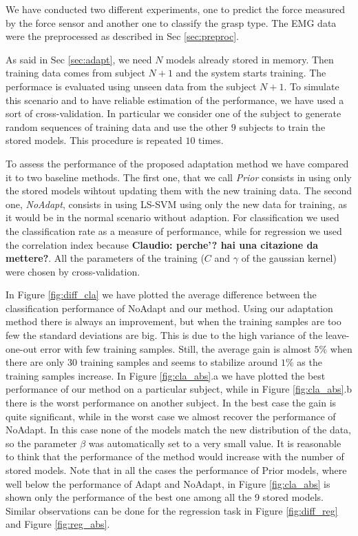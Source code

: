 We have conducted two different experiments, one to predict the force measured
by the force sensor and another one to classify the grasp type.
The EMG data were the preprocessed as described in Sec \ref{sec:preproc}.

As said in Sec \ref{sec:adapt}, we need $N$ models already stored in memory.
Then training data comes from subject $N+1$ and the system starts
training. The performace is evaluated using unseen data from the subject
$N+1$.
To simulate this scenario and to have reliable estimation of the
performance, we have used a sort of cross-validation.
In particular we consider one of the subject to generate random sequences
of training data and use the other $9$ subjects to train the stored models.
This procedure is repeated $10$ times.

To assess the performance of the proposed adaptation method we have compared it
to two baseline methods. The first one, that we call \emph{Prior} consists in
using only the stored models wihtout updating them with the new training data.
The second one, \emph{NoAdapt}, consists in using LS-SVM using only the new data
for training, as it would be in the normal scenario without adaption.
For classification we used the classification rate as a measure of performance,
while for regression we used the correlation index because \textbf{Claudio: perche'?
hai una citazione da mettere?}.
All the parameters of the training ($C$ and $\gamma$ of the gaussian kernel)
were chosen by cross-validation.

In Figure \ref{fig:diff_cla} we have plotted the average difference between 
the classification performance of NoAdapt and our method. Using our adaptation
method there is always an improvement, but when the training samples are too
few the standard deviations are big. This is due to the high variance of the
leave-one-out error with few training samples. Still, the average gain is
almost $5\%$ when there are only 30 training samples and seems to stabilize
around $1\%$ as the training samples increase.
In Figure \ref{fig:cla_abs}.a we have plotted the best performance of our method
on a particular subject, while in Figure \ref{fig:cla_abs}.b there is the worst
performance on another subject. In the best case the gain is quite significant,
while in the worst case we almost recover the performance of NoAdapt. In this
case none of the models match the new distribution of the data, so the parameter
$\beta$ was automatically set to a very small value. It is reasonable to think
that the performance of the method would increase with the number of stored
models. Note that in all the cases the performance of Prior models, where well
below the performance of Adapt and NoAdapt, in Figure \ref{fig:cla_abs} is shown
only the performance of the best one among all the 9 stored models.
Similar observations can be done for the regression task in Figure \ref{fig:diff_reg}
and Figure \ref{fig:reg_abs}.

